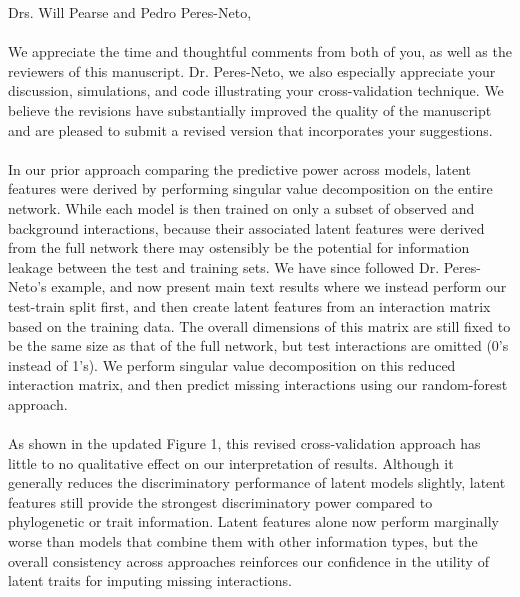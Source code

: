 \documentclass{article}
\begin{document}
\bigskip %

Drs. Will Pearse and Pedro Peres-Neto, 


\paragraph{}

We appreciate the time and thoughtful comments from both of you, as well as the reviewers of this manuscript. Dr. Peres-Neto, we also especially appreciate your discussion, simulations, and code illustrating your cross-validation technique. We believe the revisions have substantially improved the quality of the manuscript and are pleased to submit a revised version that incorporates your suggestions.

\paragraph{}In our prior approach comparing the predictive power across models, latent features were derived by performing singular value decomposition on the entire network. While each model is then trained on only a subset of observed and background interactions, because their associated latent features were derived from the full network there may ostensibly be the potential for information leakage between the test and training sets. We have since followed Dr. Peres-Neto's example, and now present main text results where we instead perform our test-train split first, and then create latent features from an interaction matrix based on the training data. The overall dimensions of this matrix are still fixed to be the same size as that of the full network, but test interactions are omitted (0's instead of 1's). We perform singular value decomposition on this reduced interaction matrix, and then predict missing interactions using our random-forest approach. 


\paragraph{}As shown in the updated Figure 1, this revised cross-validation approach has little to no qualitative effect on our interpretation of results. Although it generally reduces the discriminatory performance of latent models slightly, latent features still provide the strongest discriminatory power compared to phylogenetic or trait information. Latent features alone now perform marginally worse than models that combine them with other information types, but the overall consistency across approaches reinforces our confidence in the utility of latent traits for imputing missing interactions.\\
\\
\end{document}
